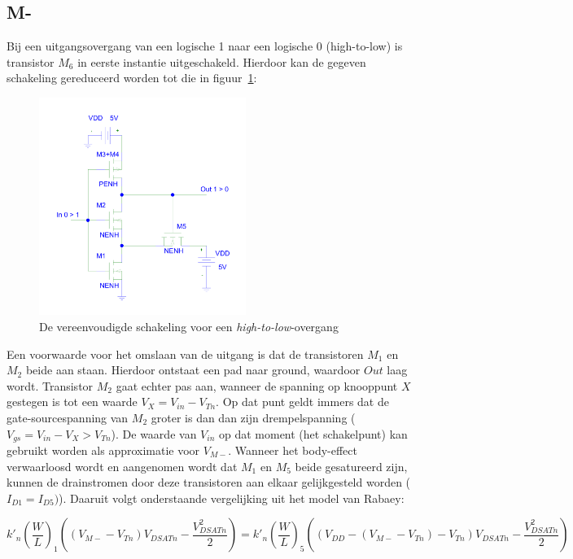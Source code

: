 \documentclass{scrartcl}  %
\begin{document}
\subsection{M-}
\label{subsec:trig-methode-mminus}
Bij een uitgangsovergang van een logische 1 naar een logische 0 (high-to-low) is transistor $M_{6}$ in eerste instantie uitgeschakeld. Hierdoor kan de gegeven schakeling gereduceerd worden tot die in figuur~\ref{fig:schmitt-schem-high-to-low}:

\begin{figure}[H]
\centering
	\includegraphics[width=0.6\textwidth]{resource/schmitt-high-to-low-rc.pdf}
	\caption{De vereenvoudigde schakeling voor een \textit{high-to-low}-overgang}
	\label{fig:schmitt-schem-high-to-low}
\end{figure}

Een voorwaarde voor het omslaan van de uitgang is dat de transistoren $M_{1}$ en $M_{2}$ beide aan staan.
Hierdoor ontstaat een pad naar ground, waardoor $Out$ laag wordt.
Transistor $M_{2}$ gaat echter pas aan, wanneer de spanning op knooppunt $X$ gestegen is tot een waarde $V_{X} = V_{in} - V_{Tn}$.
 Op dat punt geldt immers dat de gate-sourcespanning van $M_{2}$ groter is dan dan zijn drempelspanning ($V_{gs} = V_{in} - V_{X} > V_{Tn}$). 
 De waarde van $V_{in}$ op dat moment (het schakelpunt) kan gebruikt worden als approximatie voor $V_{M-}$. 
 Wanneer het body-effect verwaarloosd wordt en aangenomen wordt dat $M_{1}$ en $M_{5}$ beide gesatureerd zijn, kunnen de drainstromen door deze transistoren aan elkaar gelijkgesteld worden ($I_{D1} = I_{D5})$). 
 Daaruit volgt onderstaande vergelijking uit het model van Rabaey:

$$k'_{n}(\frac{W}{L})_{1}((V_{M-}-V_{Tn})V_{DSATn} - \frac{V^{2}_{DSATn}}{2}) = k'_{n}(\frac{W}{L})_{5}((V_{DD}-(V_{M-}-V_{Tn})-V_{Tn})V_{DSATn} - \frac{V^{2}_{DSATn}}{2})$$
\end{document}
